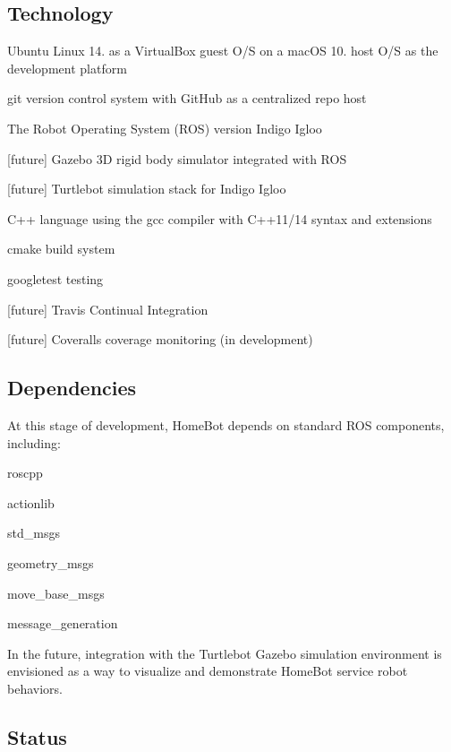 \subsection*{Technology}


\begin{DoxyItemize}
\item Ubuntu Linux 14. as a Virtual\-Box guest O/\-S on a mac\-O\-S 10. host O/\-S as the development platform
\item git version control system with Git\-Hub as a centralized repo host
\item The Robot Operating System (R\-O\-S) version Indigo Igloo
\item \mbox{[}future\mbox{]} Gazebo 3\-D rigid body simulator integrated with R\-O\-S
\item \mbox{[}future\mbox{]} Turtlebot simulation stack for Indigo Igloo
\item C++ language using the gcc compiler with C++11/14 syntax and extensions
\item cmake build system
\item googletest testing
\item \mbox{[}future\mbox{]} Travis Continual Integration
\item \mbox{[}future\mbox{]} Coveralls coverage monitoring (in development)
\end{DoxyItemize}

\subsection*{Dependencies}

At this stage of development, Home\-Bot depends on standard R\-O\-S components, including\-:
\begin{DoxyItemize}
\item roscpp
\item actionlib
\item std\-\_\-msgs
\item geometry\-\_\-msgs
\item move\-\_\-base\-\_\-msgs
\item message\-\_\-generation
\end{DoxyItemize}

In the future, integration with the Turtlebot Gazebo simulation environment is envisioned as a way to visualize and demonstrate Home\-Bot service robot behaviors.

\subsection*{Status}

